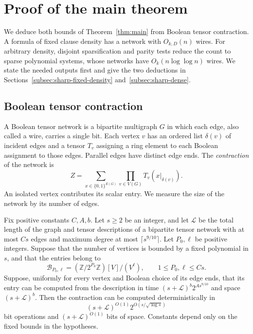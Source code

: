\section{Proof of the main theorem}\label{app:quantitative}
We deduce both bounds of Theorem~\ref{thm:main} from Boolean tensor
contraction. A formula of fixed clause density has a network with
$O_{k,D}(n)$ wires. For arbitrary density, disjoint sparsification and
parity tests reduce the count to sparse polynomial systems, whose
networks have $O_k(n\log\log n)$ wires. We state the needed outputs
first and give the two deductions in
Sections~\ref{subsec:sharp-fixed-density} and~\ref{subsec:sharp-dense}.

\subsection{Boolean tensor contraction}
\label{subsec:tensor-interface}

A Boolean tensor network is a bipartite multigraph $G$ in which each
edge, also called a wire, carries a single bit. Each vertex $v$ has an ordered list
$\delta(v)$ of incident edges and a tensor $T_v$ assigning a ring
element to each Boolean assignment to those edges. Parallel edges
have distinct edge ends. The \emph{contraction} of the network is
\[
 Z=\sum_{x\in\{0,1\}^{E(G)}}\prod_{v\in V(G)} T_v(x|_{\delta(v)}).
\]
An isolated vertex contributes its scalar entry. We measure the size
of the network by its number of edges.

\begin{theorem}\label{thm:tensor-contraction}
Fix positive constants $C,A,b$.  Let $s\ge2$ be an integer, and let
$\mathcal L$ be the total length of the graph and tensor descriptions
of a bipartite tensor network with at most $Cs$ edges and maximum
degree at most $\lceil s^{9/10}\rceil$. Let $P_0,\ell$ be positive
integers. Suppose that the number of
vertices is bounded by a fixed polynomial in $s$, and that the entries
belong to
\[
 \mathcal B_{P_0,\ell}
   =(\mathbb Z/2^{P_0}\mathbb Z)[V]/(V^\ell),
 \qquad 1\le P_0,\ell\le Cs.
\]
Suppose, uniformly for every vertex and Boolean choice of its edge ends,
that its entry can be computed from the description in time
$(s+\mathcal L)^b2^{A s^{9/10}}$ and space $(s+\mathcal L)^b$.
Then the contraction can be computed deterministically in
\[
 (s+\mathcal L)^{O(1)}
  2^{O(s/\sqrt{\log s})}
\]
bit operations and $(s+\mathcal L)^{O(1)}$ bits of space.  Constants
depend only on the fixed bounds in the hypotheses.
\end{theorem}

